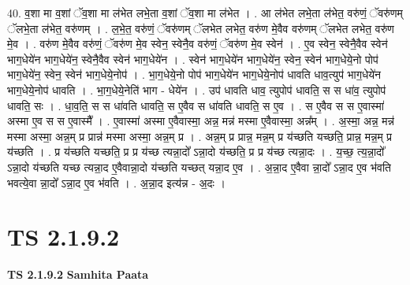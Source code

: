 \documentclass[17pt]{extarticle}
\begin{document}
40. व॒शा मा व॒शां ॅव॒शा मा ल॑भेत लभे॒ता व॒शां ॅव॒शा मा ल॑भेत । . आ ल॑भेत लभे॒ता ल॑भेत॒ वरु॑णं॒ ॅवरु॑णम् ॅलभे॒ता ल॑भेत॒ वरु॑णम् । . ल॒भे॒त॒ वरु॑णं॒ ॅवरु॑णम् ॅलभेत लभेत॒ वरु॑ण मे॒वैव वरु॑णम् ॅलभेत लभेत॒ वरु॑ण मे॒व । . वरु॑ण मे॒वैव वरु॑णं॒ ॅवरु॑ण मे॒व स्वेन॒ स्वेनै॒व वरु॑णं॒ ॅवरु॑ण मे॒व स्वेन॑ । . ए॒व स्वेन॒ स्वेनै॒वैव स्वेन॑ भाग॒धेये॑न भाग॒धेये॑न॒ स्वेनै॒वैव स्वेन॑ भाग॒धेये॑न । . स्वेन॑ भाग॒धेये॑न भाग॒धेये॑न॒ स्वेन॒ स्वेन॑ भाग॒धेये॒नो पोप॑ भाग॒धेये॑न॒ स्वेन॒ स्वेन॑ भाग॒धेये॒नोप॑ । . भा॒ग॒धेये॒नो पोप॑ भाग॒धेये॑न भाग॒धेये॒नोप॑ धावति धाव॒त्युप॑ भाग॒धेये॑न भाग॒धेये॒नोप॑ धावति । . भा॒ग॒धेये॒नेति॑ भाग - धेये॑न । . उप॑ धावति धाव॒ त्युपोप॑ धावति॒ स स धा॑व॒ त्युपोप॑ धावति॒ सः । . धा॒व॒ति॒ स स धा॑वति धावति॒ स ए॒वैव स धा॑वति धावति॒ स ए॒व । . स ए॒वैव स स ए॒वास्मा॑ अस्मा ए॒व स स ए॒वास्मै᳚ । . ए॒वास्मा॑ अस्मा ए॒वैवास्मा॒ अन्न॒ मन्न॑ मस्मा ए॒वैवास्मा॒ अन्न᳚म् । . अ॒स्मा॒ अन्न॒ मन्न॑ मस्मा अस्मा॒ अन्न॒म् प्र प्रान्न॑ मस्मा अस्मा॒ अन्न॒म् प्र । . अन्न॒म् प्र प्रान्न॒ मन्न॒म् प्र य॑च्छति यच्छति॒ प्रान्न॒ मन्न॒म् प्र य॑च्छति । . प्र य॑च्छति यच्छति॒ प्र प्र य॑च्छ त्यन्ना॒दो᳚ ऽन्ना॒दो य॑च्छति॒ प्र प्र य॑च्छ त्यन्ना॒दः । . य॒च्छ॒ त्य॒न्ना॒दो᳚ ऽन्ना॒दो य॑च्छति यच्छ त्यन्ना॒द ए॒वैवान्ना॒दो य॑च्छति यच्छत् यन्ना॒द ए॒व । . अ॒न्ना॒द ए॒वैवा न्ना॒दो᳚ ऽन्ना॒द ए॒व भ॑वति भवत्ये॒वा न्ना॒दो᳚ ऽन्ना॒द ए॒व भ॑वति । . अ॒न्ना॒द इत्य॑न्न - अ॒दः । \newline
\pagebreak
{}
\section*{ TS 2.1.9.2 }

\textbf{TS 2.1.9.2 } \newline
\textbf{Samhita Paata} \newline
\end{document}

